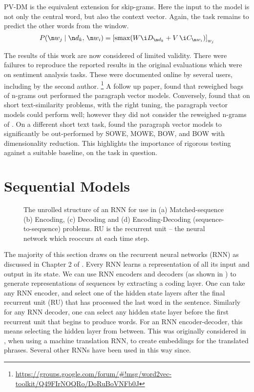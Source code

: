 {PV-DM is the equivalent extension for skip-grams.
Here the input to the model is not only the central word, but also the context vector.
Again, the task remains to predict the other words from the window.
\begin{equation}
P(\n w_j \mid \n d_k,\, \n w_{i}) = \left[ \softmax(W\i D_{\n d_k} + V\,\i C_{\n w_{i}}) \right]_{w_j} 
\end{equation}


The results of this work are now considered of limited validity.
There were failures to reproduce the reported results in the original evaluations
which were on sentiment analysis tasks.
These were documented online by several users, including by the second author.%
\footnote{ \url{https://groups.google.com/forum/\#!msg/word2vec-toolkit/Q49FIrNOQRo/DoRuBoVNFb0J}}
A follow up paper,  found that reweighed bags of n-grams  out performed the paragraph vector models.
Conversely, \textcite{lau2016doc2vecissues} found that on short text-similarity problems, with the right tuning, the paragraph vector models could perform well;
however they did not consider the reweighed n-grams of \parencite{wang2012baselines}.
On a different short text task, \textcite{White2015SentVecMeaning} found the paragraph vector models to significantly be out-performed by SOWE, MOWE, BOW, and BOW with dimensionality reduction.
This highlights the importance of rigorous testing against a suitable baseline, on the task in question.


\section{Sequential Models}

\begin{figure}
	\caption{The unrolled structure of an RNN for use in (a) Matched-sequence (b) Encoding, (c) Decoding and (d) Encoding-Decoding (sequence-to-sequence) problems. RU is the recurrent unit -- the neural network which reoccurs at each time step.
	}
	\label{fig-rnns-sq}
	
	\resizebox{\textwidth}{!}{}
\end{figure}

The majority of this section draws on the recurrent neural networks (RNN) as discussed in Chapter 2 of .
Every RNN learns a representation of all its input and output in its state.
We can use RNN encoders and decoders (as shown in ) to generate representations of sequences by extracting a coding layer.
One can take any RNN encoder,
and select one of the hidden state layers after the final recurrent unit (RU) that has processed the last word in the sentence.
Similarly for any RNN decoder, one can select any hidden state layer before the first recurrent unit that begins to produce words.
For an RNN encoder-decoder, this means selecting the hidden layer from between.
This was originally considered in , when using a machine translation RNN, to create embeddings for the translated phrases.
Several other RNNs have been used in this way since.



}
